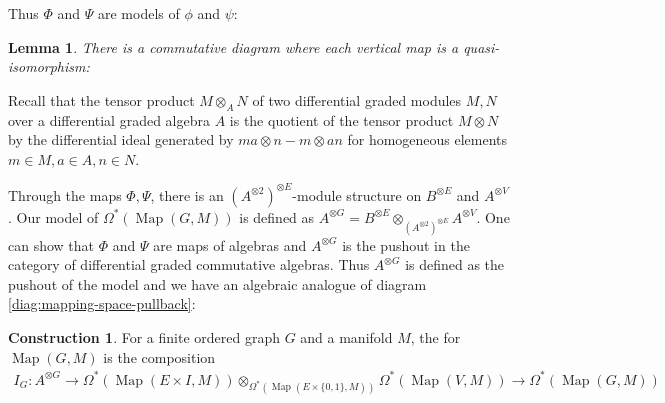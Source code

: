 \documentclass{scrartcl}
\let\emph\relax
\theoremstyle{plain}
\newtheorem{lemma}[theorem]{Lemma}
\theoremstyle{definition}
\newtheorem{construction}[theorem]{Construction}
\DeclareMathOperator{\Map}{Map}
\begin{document}
Thus $\Phi$ and $\Psi$ are models of $\phi$ and $\psi$:
\begin{lemma}\label{lem:graph-model-aid}
    There is a commutative diagram where each vertical map is a quasi-isomorphism:
    \begin{center}
    \end{center}
\end{lemma}

Recall that the tensor product $M\otimes_A N$ of two differential graded modules $M, N$ over a differential graded algebra $A$ is the quotient of the tensor product $M\otimes N$ by the differential ideal generated by $ma \otimes n - m\otimes an$ for homogeneous elements $m\in M, a\in A, n\in N$. 

Through the maps $\Phi, \Psi$, there is an $(A^{\otimes 2})^{\otimes E}$-module structure on $B^{\otimes E}$ and $A^{\otimes V}$. Our model of $\Omega^*(\Map(G, M))$ is defined as $A^{\otimes G} = B^{\otimes E}\otimes_{(A^{\otimes 2})^{\otimes E}} A^{\otimes V}$. One can show that $\Phi$ and $\Psi$ are maps of algebras and $A^{\otimes G}$ is the pushout in the category of differential graded commutative algebras. Thus $A^{\otimes G}$ is defined as the pushout of the model and we have an algebraic analogue of diagram \ref{diag:mapping-space-pullback}:

\begin{center}\label{diag:mapping-space-pullback-algebraic}
\end{center}


\begin{construction}
    For a finite ordered graph $G$ and a manifold $M$, the \emph{iterated integral map} for $\Map(G, M)$ is the composition
    \begin{align*}
        I_G\colon A^ {\otimes G}\to\Omega^*(\Map(E\times I, M))\otimes_{\Omega^*(\Map(E\times\{0,1\}, M))} \Omega^*(\Map(V, M)) \to \Omega^*(\Map(G, M))
    \end{align*}
\end{construction}
\end{document}
